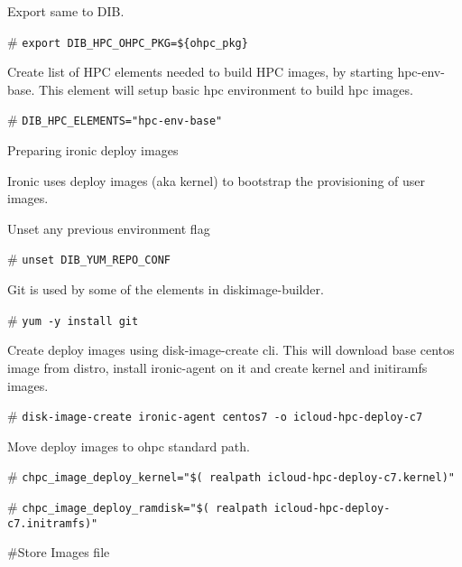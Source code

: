 \begin{section}
{Export same to DIB.

\begin{bash}[ctrlr]\# \texttt{\small{export DIB\_HPC\_OHPC\_PKG=\$\{ohpc\_pkg\}}}\end{bash}

Create list of HPC elements needed to build HPC images, by starting hpc-env-base. This element will setup basic hpc environment to build hpc images.

\begin{bash}[ctrlr]\# \texttt{\small{DIB\_HPC\_ELEMENTS="hpc-env-base"}}\end{bash}

Preparing ironic deploy images 

Ironic uses deploy images (aka kernel) to bootstrap the provisioning of user images. 

Unset any previous environment flag

\begin{bash}[ctrlr]\# \texttt{\small{unset DIB\_YUM\_REPO\_CONF}}\end{bash}

Git is used by some of the elements in diskimage-builder. 

\begin{bash}[ctrlr]\# \texttt{\small{yum -y install git}}\end{bash}

Create deploy images using disk-image-create cli. This will download base centos image from distro, install ironic-agent on it and create kernel and initiramfs images.

\begin{bash}[ctrlr]\# \texttt{\small{disk-image-create ironic-agent centos7 -o icloud-hpc-deploy-c7}}\end{bash}

Move deploy images to ohpc standard path.

\begin{bash}[ctrlr]\# \texttt{\small{chpc\_image\_deploy\_kernel="\$( realpath icloud-hpc-deploy-c7.kernel)"}}\end{bash}
\begin{bash}[ctrlr]\# \texttt{\small{chpc\_image\_deploy\_ramdisk="\$( realpath icloud-hpc-deploy-c7.initramfs)"}}\end{bash}

 \#Store Images file

}
\end{section}
